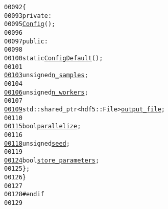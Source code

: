 \begin{footnotesize}
\begin{alltt}
00092     \{
00093         \textcolor{keyword}{private}:
00095             \hyperlink{structeos_1_1PriorSampler_1_1Config}{Config}();
00096 
00097         \textcolor{keyword}{public}:
00098 
00100             \textcolor{keyword}{static} \hyperlink{structeos_1_1PriorSampler_1_1Config}{Config} \hyperlink{structeos_1_1PriorSampler_1_1Config_ab56ba1088eae165d73629213c7e72450}{Default}();
00101 
\hypertarget{prior__sampler_8hh_source_l00103}{}\hyperlink{structeos_1_1PriorSampler_1_1Config_a2db80db4647764792f4370590e0cfb38}{00103}             \textcolor{keywordtype}{unsigned} \hyperlink{structeos_1_1PriorSampler_1_1Config_a2db80db4647764792f4370590e0cfb38}{n_samples};
00104 
\hypertarget{prior__sampler_8hh_source_l00106}{}\hyperlink{structeos_1_1PriorSampler_1_1Config_a4bb4bb97708f5dc7cd8414489a2808c9}{00106}             \textcolor{keywordtype}{unsigned} \hyperlink{structeos_1_1PriorSampler_1_1Config_a4bb4bb97708f5dc7cd8414489a2808c9}{n_workers};
00107 
\hypertarget{prior__sampler_8hh_source_l00109}{}\hyperlink{structeos_1_1PriorSampler_1_1Config_ab11de7880341b9e9ea13e9332f574483}{00109}             std::shared\_ptr<hdf5::File> \hyperlink{structeos_1_1PriorSampler_1_1Config_ab11de7880341b9e9ea13e9332f574483}{output_file};
00110 
\hypertarget{prior__sampler_8hh_source_l00115}{}\hyperlink{structeos_1_1PriorSampler_1_1Config_ac59ca5849359f3bc11188e7de73c93c2}{00115}             \textcolor{keywordtype}{bool} \hyperlink{structeos_1_1PriorSampler_1_1Config_ac59ca5849359f3bc11188e7de73c93c2}{parallelize};
00116 
\hypertarget{prior__sampler_8hh_source_l00118}{}\hyperlink{structeos_1_1PriorSampler_1_1Config_a9f056d7db9c1a40a51520534ab13ee95}{00118}             \textcolor{keywordtype}{unsigned} \hyperlink{structeos_1_1PriorSampler_1_1Config_a9f056d7db9c1a40a51520534ab13ee95}{seed};
00119 
\hypertarget{prior__sampler_8hh_source_l00124}{}\hyperlink{structeos_1_1PriorSampler_1_1Config_aa572418843b732c559f5b9612d4bf2fa}{00124}             \textcolor{keywordtype}{bool} \hyperlink{structeos_1_1PriorSampler_1_1Config_aa572418843b732c559f5b9612d4bf2fa}{store_parameters};
00125     \};
00126 \}
00127 
00128 \textcolor{preprocessor}{#endif}
00129 \textcolor{preprocessor}{}
\end{alltt}\end{footnotesize}
